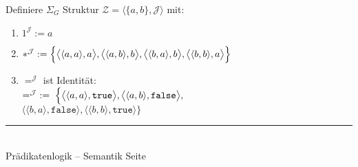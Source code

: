 \documentclass{slides}
\newcommand{\myrule}{\rule{20cm}{1mm}\\ }
\def\pair(#1,#2){\langle #1, #2 \rangle}
\newcounter{mypage}
\begin{document}
\begin{slide}{}
Definiere $\Sigma_G$ Struktur $\mathcal{Z} = \langle \{a, b\}, \mathcal{J}\rangle$ mit:
\begin{enumerate}
\item $1^\mathcal{J} := a$ 
\item $*^\mathcal{J} := \Bigl\{ \bigl\langle\pair(a,a), a\bigr\rangle,
                                   \bigl\langle\pair(a,b), b\bigr\rangle,
                                   \bigl\langle\pair(b,a), b\bigr\rangle,
                                   \bigl\langle\pair(b,b), a\bigr\rangle \Bigr\}$
\item $=^\mathcal{J}$ ist Identität: \\[0.1cm]
       $=^\mathcal{J} \;:=\; \Bigl\{ \bigl\langle\pair(a,a), \mathtt{true}\bigr\rangle,
                                 \bigl\langle\pair(a,b), \mathtt{false}\bigr\rangle,$\\[0.1cm]
\hspace*{2.3cm} $                \bigl\langle\pair(b,a), \mathtt{false}\bigr\rangle,
                                 \bigl\langle\pair(b,b), \mathtt{true}\bigr\rangle \Bigr\}$
\end{enumerate}



\vspace*{\fill}
\tiny \addtocounter{mypage}{1} 
\myrule
Prädikatenlogik -- Semantik \hspace*{\fill} Seite 
\end{slide}

\end{document}
